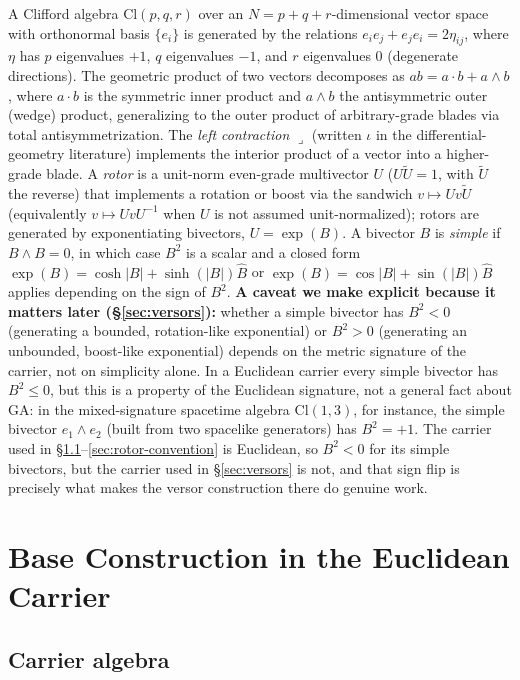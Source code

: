 \documentclass[11pt]{article}
\newcommand{\Cl}{\mathrm{Cl}}
\begin{document}
A Clifford algebra $\Cl(p,q,r)$ over an $N=p+q+r$-dimensional vector space with orthonormal basis $\{e_i\}$ is generated by the relations $e_i e_j + e_j e_i = 2\eta_{ij}$, where $\eta$ has $p$ eigenvalues $+1$, $q$ eigenvalues $-1$, and $r$ eigenvalues $0$ (degenerate directions). The geometric product of two vectors decomposes as $ab = a\cdot b + a\wedge b$, where $a\cdot b$ is the symmetric inner product and $a\wedge b$ the antisymmetric outer (wedge) product, generalizing to the outer product of arbitrary-grade blades via total antisymmetrization. The \emph{left contraction} $\lrcorner$ (written $\iota$ in the differential-geometry literature) implements the interior product of a vector into a higher-grade blade. A \emph{rotor} is a unit-norm even-grade multivector $U$ ($U\tilde U = 1$, with $\tilde U$ the reverse) that implements a rotation or boost via the sandwich $v \mapsto U v \tilde U$ (equivalently $v\mapsto UvU^{-1}$ when $U$ is not assumed unit-normalized); rotors are generated by exponentiating bivectors, $U=\exp(B)$. A bivector $B$ is \emph{simple} if $B\wedge B=0$, in which case $B^2$ is a scalar and a closed form $\exp(B)=\cosh|B|+\sinh(|B|)\hat B$ or $\exp(B)=\cos|B|+\sin(|B|)\hat B$ applies depending on the sign of $B^2$. \textbf{A caveat we make explicit because it matters later (\S\ref{sec:versors}):} whether a simple bivector has $B^2<0$ (generating a bounded, rotation-like exponential) or $B^2>0$ (generating an unbounded, boost-like exponential) depends on the metric signature of the carrier, not on simplicity alone. In a Euclidean carrier every simple bivector has $B^2\le 0$, but this is a property of the Euclidean signature, not a general fact about GA: in the mixed-signature spacetime algebra $\Cl(1,3)$, for instance, the simple bivector $e_1\wedge e_2$ (built from two spacelike generators) has $B^2=+1$. The carrier used in \S\ref{sec:carrier}--\ref{sec:rotor-convention} is Euclidean, so $B^2<0$ for its simple bivectors, but the carrier used in \S\ref{sec:versors} is not, and that sign flip is precisely what makes the versor construction there do genuine work.

\section{Base Construction in the Euclidean Carrier}

\subsection{Carrier algebra}
\label{sec:carrier}
\end{document}
